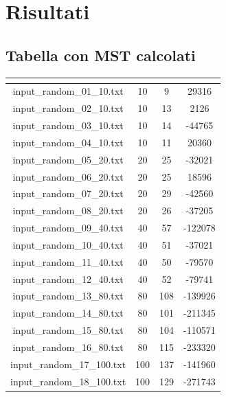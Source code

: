\section{Risultati}\label{risultati}

\subsection{Tabella con MST calcolati}
	
	\renewcommand{\arraystretch}{1.5}
	\begin{longtable}{|c|c|c|c|}
		\hline
		\rowcolor{title_row}
		\textbf{\color{title_text}{Input file}} &
		\textbf{\color{title_text}{num\_vertici}} & \textbf{\color{title_text}{num\_archi}} & \textbf{\color{title_text}{MST}}\\
		\hline
		\endhead
		input\_random\_01\_10.txt & 10 & 9 & 29316 \\ \hline 
		input\_random\_02\_10.txt & 10 & 13 & 2126 \\ \hline 
		input\_random\_03\_10.txt & 10 & 14 & -44765 \\ \hline
		input\_random\_04\_10.txt & 10 & 11 & 20360 \\ \hline
		input\_random\_05\_20.txt & 20 & 25 & -32021 \\ \hline
		input\_random\_06\_20.txt & 20 & 25 & 18596 \\ \hline
		input\_random\_07\_20.txt & 20 & 29 & -42560 \\ \hline
		input\_random\_08\_20.txt & 20 & 26 & -37205 \\ \hline
		input\_random\_09\_40.txt & 40 & 57 & -122078 \\ \hline
		input\_random\_10\_40.txt & 40 & 51 & -37021 \\ \hline
		input\_random\_11\_40.txt & 40 & 50 & -79570 \\ \hline
		input\_random\_12\_40.txt & 40 & 52 & -79741 \\ \hline
		input\_random\_13\_80.txt & 80 & 108 & -139926 \\ \hline
		input\_random\_14\_80.txt & 80 & 101 & -211345 \\ \hline
		input\_random\_15\_80.txt & 80 & 104 & -110571 \\ \hline
		input\_random\_16\_80.txt & 80 & 115 & -233320 \\ \hline
		input\_random\_17\_100.txt & 100 & 137 & -141960 \\ \hline
		input\_random\_18\_100.txt & 100 & 129 & -271743 \\ \hline

\end{longtable}
